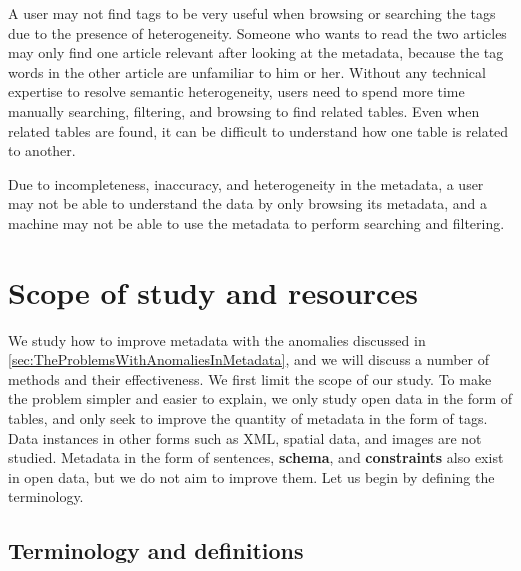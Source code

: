 A user may not find tags to be very useful when browsing or searching the tags due to the presence of heterogeneity. Someone who wants to read the two articles may only find one article relevant after looking at the metadata, because the tag words in the other article are unfamiliar to him or her. Without any technical expertise to resolve semantic heterogeneity, users need to spend more time manually searching, filtering, and browsing to find related tables. Even when related tables are found, it can be difficult to understand how one table is related to another.

Due to incompleteness, inaccuracy, and heterogeneity in the metadata, a user may not be able to understand the data by only browsing its metadata, and a machine may not be able to use the metadata to perform searching and filtering.

\section{Scope of study and resources}
\label{sec:ScopeOfStudyAndResources}

We study how to improve metadata with the anomalies discussed in \autoref{sec:TheProblemsWithAnomaliesInMetadata}, and we will discuss a number of methods and their effectiveness. We first limit the scope of our study. To make the problem simpler and easier to explain, we only study open data in the form of tables, and only seek to improve the quantity of metadata in the form of tags. Data instances in other forms such as XML, spatial data, and images are not studied. Metadata in the form of sentences, \textbf{\gls{schema}}, and \textbf{\glspl{constraint}} also exist in open data, but we do not aim to improve them. Let us begin by defining the terminology.

\subsection{Terminology and definitions}

